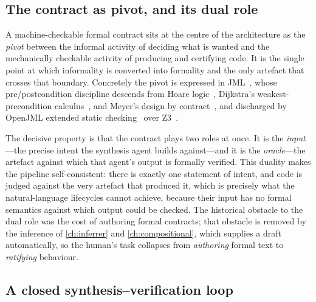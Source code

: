 \subsection{The contract as pivot, and its dual role}\label{sec:int-pivot}

A machine-checkable formal contract sits at the centre of the architecture as the
\emph{pivot} between the informal activity of deciding what is wanted and the
mechanically checkable activity of producing and certifying code. It is the single
point at which informality is converted into formality and the only artefact that
crosses that boundary. Concretely the pivot is expressed in
JML~\citep{leavens2006jml}, whose pre/postcondition discipline descends from Hoare
logic~\citep{hoare1969axiomatic}, Dijkstra's weakest-precondition
calculus~\citep{dijkstra1976discipline}, and Meyer's design by
contract~\citep{meyer1992dbc}, and discharged by OpenJML extended static
checking~\citep{cok2014openjml} over Z3~\citep{demoura2008z3}.

The decisive property is that the contract plays two roles at once. It is the
\emph{input}---the precise intent the synthesis agent builds against---and it is
the \emph{oracle}---the artefact against which that agent's output is formally
verified. This duality makes the pipeline self-consistent: there is exactly one
statement of intent, and code is judged against the very artefact that produced it,
which is precisely what the natural-language lifecycles cannot achieve, because
their input has no formal semantics against which output could be checked. The
historical obstacle to the dual role was the cost of authoring formal contracts;
that obstacle is removed by the inference of \cref{ch:inferrer} and
\cref{ch:compositional}, which supplies a draft automatically, so the human's task
collapses from \emph{authoring} formal text to \emph{ratifying} behaviour.

\subsection{A closed synthesis--verification loop}\label{sec:int-loop}


